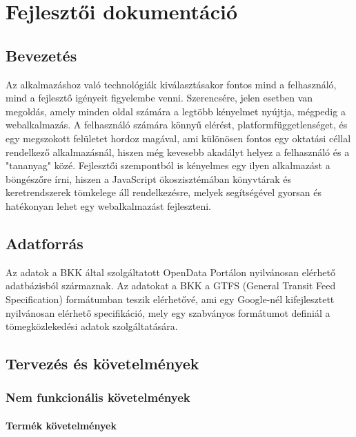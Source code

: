 \chapter{Fejlesztői dokumentáció}
\label{ch:dev}

\section{Bevezetés}

Az alkalmazáshoz való technológiák kiválasztásakor fontos mind a felhasználó, mind a fejlesztő igényeit figyelembe venni. Szerencsére, jelen esetben van megoldás, amely minden oldal számára a legtöbb kényelmet nyújtja, mégpedig a webalkalmazás. A felhasználó számára könnyű elérést, platformfüggetlenséget, és egy megszokott felületet hordoz magával, ami különösen fontos egy oktatási céllal rendelkező alkalmazásnál, hiszen még kevesebb akadályt helyez a felhasználó és a "tananyag" közé. Fejlesztői szempontból is kényelmes egy ilyen alkalmazást a böngészőre írni, hiszen a JavaScript ökoszisztémában könyvtárak és keretrendszerek tömkelege áll rendelkezésre, melyek segítségével gyorsan és hatékonyan lehet egy webalkalmazást fejleszteni.

\section{Adatforrás}

Az adatok a BKK által szolgáltatott OpenData Portálon\cite{bkkopendata} nyilvánosan elérhető adatbázisból származnak. Az adatokat a BKK a GTFS (General Transit Feed Specification) formátumban teszik elérhetővé, ami egy Google-nél kifejlesztett\cite{gtfsabout} nyilvánosan elérhető specifikáció, mely egy szabványos formátumot definiál a tömegközlekedési adatok szolgáltatására.

\section{Tervezés és követelmények}

\subsection{Nem funkcionális követelmények}

\subsubsection{Termék követelmények}

